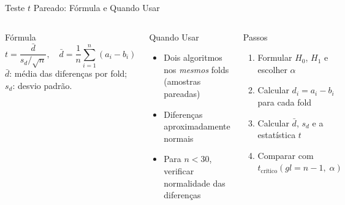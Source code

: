 \documentclass[aspectratio=169]{beamer}
\begin{document}
\begin{frame}{Teste $t$ Pareado: Fórmula e Quando Usar}
    \begin{columns}
        \begin{block}{Fórmula}
            \[
              t = \frac{\bar{d}}{s_d / \sqrt{n}}, \quad
              \bar{d} = \frac{1}{n}\sum_{i=1}^{n}(a_i - b_i)
            \]
            \footnotesize $\bar{d}$: média das diferenças por fold; $s_d$: desvio padrão.
        \end{block}
        \pause
        \begin{block}{Quando Usar}
            \begin{itemize}\footnotesize
                \item Dois algoritmos nos \textit{mesmos} folds (amostras pareadas)
                \item Diferenças aproximadamente normais
                \item Para $n < 30$, verificar normalidade das diferenças
            \end{itemize}
        \end{block}
        \pause
        \begin{block}{Passos}
            \begin{enumerate}\footnotesize
                \item Formular $H_0$, $H_1$ e escolher $\alpha$
                \item Calcular $d_i = a_i - b_i$ para cada fold
                \item Calcular $\bar{d}$, $s_d$ e a estatística $t$
                \item Comparar com $t_{\text{crítico}}(gl=n-1,\;\alpha)$
            \end{enumerate}
        \end{block}
 
    \end{columns}
\end{frame}
\end{document}
